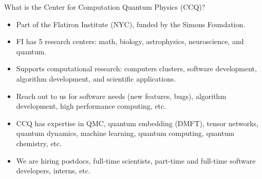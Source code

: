 \begin{frame}{What is the Center for Computation Quantum Physics (CCQ)?}

\begin{itemize}[<+->]

  \item Part of the Flatiron Institute (NYC), funded by the Simons Foundation.
  \item FI has 5 research centers: math, biology, astrophysics, neuroscience, and quantum.
  \item Supports computational research: computers clusters, software development, algorithm development, and scientific applications.
  \item Reach out to us for software needs (new features, bugs), algorithm development, high performance computing, etc.
  \item CCQ has expertise in QMC, quantum embedding (DMFT), tensor networks, quantum dynamics, machine learning, quantum computing, quantum chemistry, etc.
  \item We are hiring postdocs, full-time scientists, part-time and full-time software developers, interns, etc.

\end{itemize}

\end{frame}
